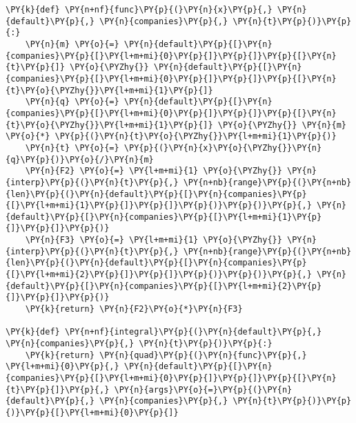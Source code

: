 \begin{tcolorbox}[breakable, size=fbox, boxrule=1pt, pad at break*=1mm,colback=cellbackground, colframe=cellborder]
\begin{Verbatim}[commandchars=\\\{\}]
\PY{k}{def} \PY{n+nf}{func}\PY{p}{(}\PY{n}{x}\PY{p}{,} \PY{n}{default}\PY{p}{,} \PY{n}{companies}\PY{p}{,} \PY{n}{t}\PY{p}{)}\PY{p}{:}
    \PY{n}{m} \PY{o}{=} \PY{n}{default}\PY{p}{[}\PY{n}{companies}\PY{p}{[}\PY{l+m+mi}{0}\PY{p}{]}\PY{p}{]}\PY{p}{[}\PY{n}{t}\PY{p}{]} \PY{o}{\PYZhy{}} \PY{n}{default}\PY{p}{[}\PY{n}{companies}\PY{p}{[}\PY{l+m+mi}{0}\PY{p}{]}\PY{p}{]}\PY{p}{[}\PY{n}{t}\PY{o}{\PYZhy{}}\PY{l+m+mi}{1}\PY{p}{]}
    \PY{n}{q} \PY{o}{=} \PY{n}{default}\PY{p}{[}\PY{n}{companies}\PY{p}{[}\PY{l+m+mi}{0}\PY{p}{]}\PY{p}{]}\PY{p}{[}\PY{n}{t}\PY{o}{\PYZhy{}}\PY{l+m+mi}{1}\PY{p}{]} \PY{o}{\PYZhy{}} \PY{n}{m} \PY{o}{*} \PY{p}{(}\PY{n}{t}\PY{o}{\PYZhy{}}\PY{l+m+mi}{1}\PY{p}{)}
    \PY{n}{t} \PY{o}{=} \PY{p}{(}\PY{n}{x}\PY{o}{\PYZhy{}}\PY{n}{q}\PY{p}{)}\PY{o}{/}\PY{n}{m}
    \PY{n}{F2} \PY{o}{=} \PY{l+m+mi}{1} \PY{o}{\PYZhy{}} \PY{n}{interp}\PY{p}{(}\PY{n}{t}\PY{p}{,} \PY{n+nb}{range}\PY{p}{(}\PY{n+nb}{len}\PY{p}{(}\PY{n}{default}\PY{p}{[}\PY{n}{companies}\PY{p}{[}\PY{l+m+mi}{1}\PY{p}{]}\PY{p}{]}\PY{p}{)}\PY{p}{)}\PY{p}{,} \PY{n}{default}\PY{p}{[}\PY{n}{companies}\PY{p}{[}\PY{l+m+mi}{1}\PY{p}{]}\PY{p}{]}\PY{p}{)}
    \PY{n}{F3} \PY{o}{=} \PY{l+m+mi}{1} \PY{o}{\PYZhy{}} \PY{n}{interp}\PY{p}{(}\PY{n}{t}\PY{p}{,} \PY{n+nb}{range}\PY{p}{(}\PY{n+nb}{len}\PY{p}{(}\PY{n}{default}\PY{p}{[}\PY{n}{companies}\PY{p}{[}\PY{l+m+mi}{2}\PY{p}{]}\PY{p}{]}\PY{p}{)}\PY{p}{)}\PY{p}{,} \PY{n}{default}\PY{p}{[}\PY{n}{companies}\PY{p}{[}\PY{l+m+mi}{2}\PY{p}{]}\PY{p}{]}\PY{p}{)}
    \PY{k}{return} \PY{n}{F2}\PY{o}{*}\PY{n}{F3}

\PY{k}{def} \PY{n+nf}{integral}\PY{p}{(}\PY{n}{default}\PY{p}{,} \PY{n}{companies}\PY{p}{,} \PY{n}{t}\PY{p}{)}\PY{p}{:}
    \PY{k}{return} \PY{n}{quad}\PY{p}{(}\PY{n}{func}\PY{p}{,} \PY{l+m+mi}{0}\PY{p}{,} \PY{n}{default}\PY{p}{[}\PY{n}{companies}\PY{p}{[}\PY{l+m+mi}{0}\PY{p}{]}\PY{p}{]}\PY{p}{[}\PY{n}{t}\PY{p}{]}\PY{p}{,} \PY{n}{args}\PY{o}{=}\PY{p}{(}\PY{n}{default}\PY{p}{,} \PY{n}{companies}\PY{p}{,} \PY{n}{t}\PY{p}{)}\PY{p}{)}\PY{p}{[}\PY{l+m+mi}{0}\PY{p}{]}
                 

\end{Verbatim}
\end{tcolorbox}
